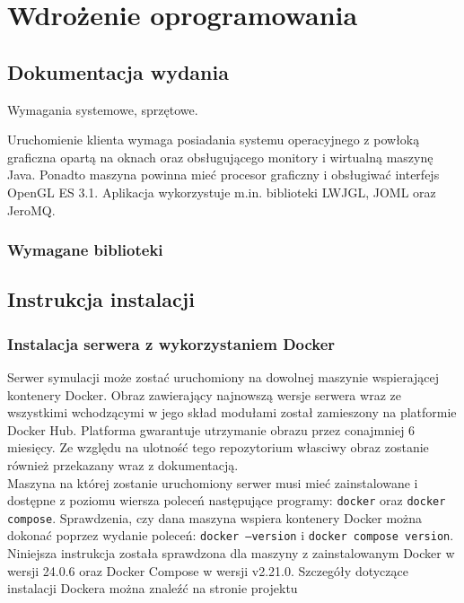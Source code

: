 \documentclass[15pt]{sprawozdanie}
\begin{document}
\newpage
\section{Wdrożenie oprogramowania}
\subsection{Dokumentacja wydania}
Wymagania systemowe, sprzętowe. 

Uruchomienie klienta wymaga posiadania systemu operacyjnego z powłoką graficzna opartą na oknach oraz obsługującego monitory i wirtualną maszynę Java. Ponadto maszyna powinna mieć procesor graficzny i obsługiwać interfejs OpenGL ES 3.1. Aplikacja wykorzystuje  m.in. biblioteki LWJGL, JOML oraz JeroMQ.

\subsubsection{Wymagane biblioteki} \label{libraries}

\subsection{Instrukcja instalacji}
\subsubsection{Instalacja serwera z wykorzystaniem Docker} \label{docker_server}

Serwer symulacji może zostać uruchomiony na dowolnej maszynie wspierającej kontenery Docker. Obraz zawierający najnowszą wersje serwera wraz ze wszystkimi wchodzącymi w jego skład modułami został zamieszony na platformie Docker Hub. Platforma gwarantuje utrzymanie obrazu przez conajmniej 6 miesięcy. Ze względu na ulotność tego repozytorium własciwy obraz zostanie również przekazany wraz z dokumentacją.\\

Maszyna na której zostanie uruchomiony serwer musi mieć zainstalowane i dostępne z poziomu wiersza poleceń następujące programy: \texttt{docker} oraz \texttt{docker compose}. Sprawdzenia, czy dana maszyna wspiera kontenery Docker można dokonać poprzez wydanie poleceń: \texttt{docker --version} i \texttt{docker compose version}. Niniejsza instrukcja została sprawdzona dla maszyny z zainstalowanym Docker w wersji 24.0.6 oraz Docker Compose w wersji v2.21.0. Szczegóły dotyczące instalacji Dockera można znaleźć na stronie projektu \cite{docker}\\
\end{document}
